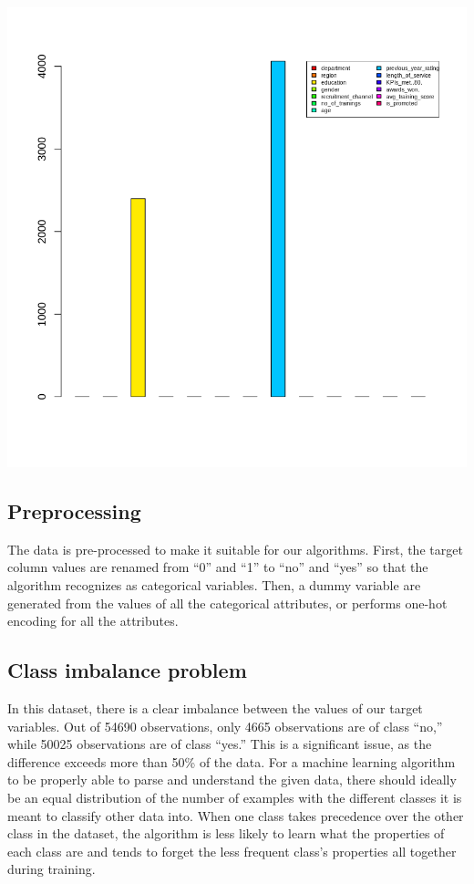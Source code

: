 \documentclass[
]{article}
\let\origfigure\figure
\let\endorigfigure\endfigure
\renewenvironment{figure}[1][2] {
    \expandafter\origfigure\expandafter[H]
} {
    \endorigfigure
}
\begin{document}
\begin{figure}
\centering
\includegraphics{./imgs/null_freq.png}
\caption{Bar plot of columns along with the frequence of null values in
them}
\end{figure}

\hypertarget{preprocessing}{%
\subsection{Preprocessing}\label{preprocessing}}

The data is pre-processed to make it suitable for our algorithms. First,
the target column values are renamed from ``0'' and ``1'' to ``no'' and
``yes'' so that the algorithm recognizes as categorical variables. Then,
a dummy variable are generated from the values of all the categorical
attributes, or performs one-hot encoding for all the attributes.

\hypertarget{class-imbalance-problem}{%
\subsection{Class imbalance problem}\label{class-imbalance-problem}}

In this dataset, there is a clear imbalance between the values of our
target variables. Out of 54690 observations, only 4665 observations are
of class ``no,'' while 50025 observations are of class ``yes.'' This is
a significant issue, as the difference exceeds more than 50\% of the
data. For a machine learning algorithm to be properly able to parse and
understand the given data, there should ideally be an equal distribution
of the number of examples with the different classes it is meant to
classify other data into. When one class takes precedence over the other
class in the dataset, the algorithm is less likely to learn what the
properties of each class are and tends to forget the less frequent
class's properties all together during training.
\end{document}
